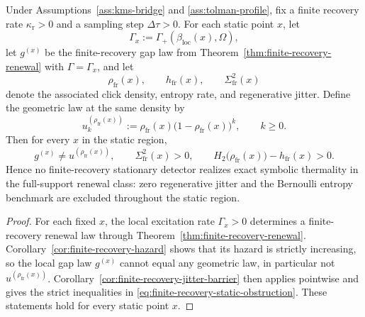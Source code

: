 \begin{theorem}\label{thm:finite-recovery-obstruction}
Under Assumptions~\ref{ass:kms-bridge} and \ref{ass:tolman-profile}, fix a finite recovery rate $\kappa_{\mathrm r}>0$ and a sampling step $\Delta\tau>0$. For each static point $x$, let
\[
\Gamma_x:=\Gamma_+(\beta_{\mathrm{loc}}(x),\Omega),
\]
let $g^{(x)}$ be the finite-recovery gap law from Theorem~\ref{thm:finite-recovery-renewal} with $\Gamma=\Gamma_x$, and let
\[
\rho_{\mathrm{fr}}(x),
\qquad
h_{\mathrm{fr}}(x),
\qquad
\Sigma_{\mathrm{fr}}^2(x)
\]
denote the associated click density, entropy rate, and regenerative jitter. Define the geometric law at the same density by
\[
u_k^{(\rho_{\mathrm{fr}}(x))}
:=
\rho_{\mathrm{fr}}(x)\bigl(1-\rho_{\mathrm{fr}}(x)\bigr)^k,
\qquad
k\ge 0.
\]
Then for every $x$ in the static region,
\begin{equation}\label{eq:finite-recovery-static-obstruction}
g^{(x)}\neq u^{(\rho_{\mathrm{fr}}(x))},
\qquad
\Sigma_{\mathrm{fr}}^2(x)>0,
\qquad
H_2\!\bigl(\rho_{\mathrm{fr}}(x)\bigr)-h_{\mathrm{fr}}(x)>0.
\end{equation}
Hence no finite-recovery stationary detector realizes exact symbolic thermality in the full-support renewal class: zero regenerative jitter and the Bernoulli entropy benchmark are excluded throughout the static region.
\end{theorem}

\begin{proof}
For each fixed $x$, the local excitation rate $\Gamma_x>0$ determines a finite-recovery renewal law through Theorem~\ref{thm:finite-recovery-renewal}. Corollary~\ref{cor:finite-recovery-hazard} shows that its hazard is strictly increasing, so the local gap law $g^{(x)}$ cannot equal any geometric law, in particular not $u^{(\rho_{\mathrm{fr}}(x))}$. Corollary~\ref{cor:finite-recovery-jitter-barrier} then applies pointwise and gives the strict inequalities in \eqref{eq:finite-recovery-static-obstruction}. These statements hold for every static point $x$.
\end{proof}

